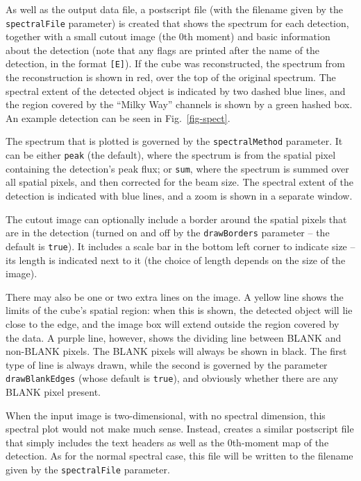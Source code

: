 As well as the output data file, a postscript file (with the filename
given by the \texttt{spectralFile} parameter) is created that shows
the spectrum for each detection, together with a small cutout image
(the 0th moment) and basic information about the detection (note that
any flags are printed after the name of the detection, in the format
\texttt{[E]}). If the cube was reconstructed, the spectrum from the
reconstruction is shown in red, over the top of the original
spectrum. The spectral extent of the detected object is indicated by
two dashed blue lines, and the region covered by the ``Milky Way''
channels is shown by a green hashed box. An example detection can be
seen in Fig.~\ref{fig-spect}.

The spectrum that is plotted is governed by the
\texttt{spectralMethod} parameter. It can be either \texttt{peak} (the
default), where the spectrum is from the spatial pixel containing the
detection's peak flux; or \texttt{sum}, where the spectrum is summed
over all spatial pixels, and then corrected for the beam size.  The
spectral extent of the detection is indicated with blue lines, and a
zoom is shown in a separate window.

The cutout image can optionally include a border around the spatial
pixels that are in the detection (turned on and off by the
\texttt{drawBorders} parameter -- the default is \texttt{true}). It
includes a scale bar in the bottom left corner to indicate size -- its
length is indicated next to it (the choice of length depends on the
size of the image).

There may also be one or two extra lines on the image. A yellow line
shows the limits of the cube's spatial region: when this is shown, the
detected object will lie close to the edge, and the image box will
extend outside the region covered by the data. A purple line, however,
shows the dividing line between BLANK and non-BLANK pixels. The BLANK
pixels will always be shown in black. The first type of line is always
drawn, while the second is governed by the parameter
\texttt{drawBlankEdges} (whose default is \texttt{true}), and
obviously whether there are any BLANK pixel present.


When the input image is two-dimensional, with no spectral dimension,
this spectral plot would not make much sense. Instead, \duchamp
creates a similar postscript file that simply includes the text
headers as well as the 0th-moment map of the detection. As for the
normal spectral case, this file will be written to the filename given
by the \texttt{spectralFile} parameter.

